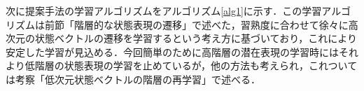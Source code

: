 \vspace{\baselineskip}
次に提案手法の学習アルゴリズムをアルゴリズム\ref{alg1}に示す．この学習アルゴリズムは前節「階層的な状態表現の遷移」で述べた，習熟度に合わせて徐々に高次元の状態ベクトルの遷移を学習するという考え方に基づいており，これにより安定した学習が見込める．今回簡単のために高階層の潜在表現の学習時にはそれより低階層の状態表現の学習を止めているが，他の方法も考えられ，これついては考察「低次元状態ベクトルの階層の再学習」で述べる．








